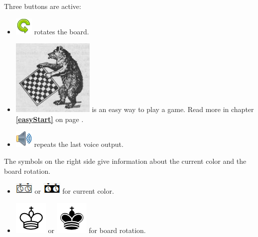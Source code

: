 \documentclass[11pt,a4paper]{article}
\begin{document}
	Three buttons are active:
	\begin{itemize}
		\item \includegraphics[scale=0.4]{arrow_rotate_anticlockwise.png} rotates the board.
		\item \includegraphics[scale=0.2]{bearchess_2.png} is an easy way to play a game.
		Read more in chapter \textbf{\ref{easyStart}  } on page \pageref{easyStart}.
		\item \includegraphics[scale=0.4]{sound.png} repeats the last voice output.
	\end{itemize}
	The symbols on the right side give information about the current color and the board rotation.
	\begin{itemize}
		\item \includegraphics[scale=0.6]{WhiteClock.png} or \includegraphics[scale=0.6]{BlackClock.png} for current color.
		\item \includegraphics[scale=0.3]{KingW.png}  or \includegraphics[scale=0.3]{KingB.png} for board rotation. 
	\end{itemize}
	
	
\end{document}
